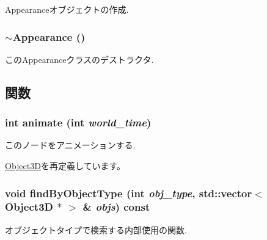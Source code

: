 Appearanceオブジェクトの作成. \hypertarget{classm3g_1_1Appearance_c05c93d7a0f286cb9471b6c667ffeee1}{
\subsubsection[{$\sim$Appearance}]{\setlength{\rightskip}{0pt plus 5cm}$\sim${\bf Appearance} ()}}
\label{classm3g_1_1Appearance_c05c93d7a0f286cb9471b6c667ffeee1}


このAppearanceクラスのデストラクタ. 

\subsection{関数}
\hypertarget{classm3g_1_1Appearance_8aad1ceab4c2a03609c8a42324ce484d}{
\subsubsection[{animate}]{\setlength{\rightskip}{0pt plus 5cm}int animate (int {\em world\_\-time})}}
\label{classm3g_1_1Appearance_8aad1ceab4c2a03609c8a42324ce484d}


このノードをアニメーションする. 

\hyperlink{classm3g_1_1Object3D_8aad1ceab4c2a03609c8a42324ce484d}{Object3D}を再定義しています。\hypertarget{classm3g_1_1Appearance_4dadb21b568b0230fac106f15040138c}{
\subsubsection[{findByObjectType}]{\setlength{\rightskip}{0pt plus 5cm}void findByObjectType (int {\em obj\_\-type}, \/  std::vector$<$ {\bf Object3D} $\ast$ $>$ \& {\em objs}) const}}
\label{classm3g_1_1Appearance_4dadb21b568b0230fac106f15040138c}


オブジェクトタイプで検索する内部使用の関数. 


